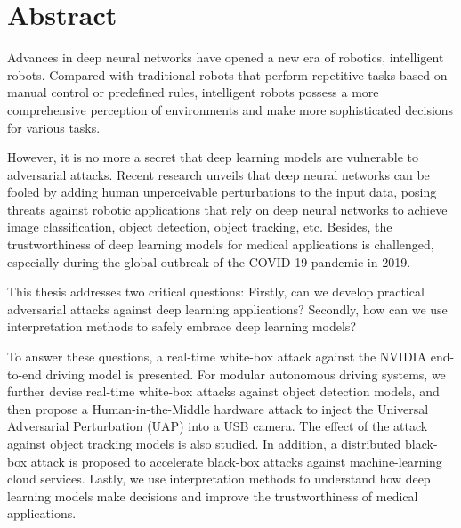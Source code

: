 \chapter*{Abstract}

Advances in deep neural networks have opened a new era of robotics, intelligent robots. Compared with traditional robots that perform repetitive tasks based on manual control or predefined rules, intelligent robots possess a more comprehensive perception of environments and make more sophisticated decisions for various tasks.
 
However, it is no more a secret that deep learning models are vulnerable to adversarial attacks. Recent research unveils that deep neural networks can be fooled by adding human unperceivable perturbations to the input data, posing threats against robotic applications that rely on deep neural networks to achieve image classification, object detection, object tracking, etc. Besides, the trustworthiness of deep learning models for medical applications is challenged, especially during the global outbreak of the COVID-19 pandemic in 2019.

This thesis addresses two critical questions: Firstly, can we develop practical adversarial attacks against deep learning applications? Secondly, how can we use interpretation methods to safely embrace deep learning models?

To answer these questions, a real-time white-box attack against the NVIDIA end-to-end driving model is presented. For modular autonomous driving systems, we further devise real-time white-box attacks against object detection models, and then propose a Human-in-the-Middle hardware attack to inject the Universal Adversarial Perturbation (UAP) into a USB camera. The effect of the attack against object tracking models is also studied. In addition, a distributed black-box attack is proposed to accelerate black-box attacks against machine-learning cloud services. Lastly, we use interpretation methods to understand how deep learning models make decisions and improve the trustworthiness of medical applications.


